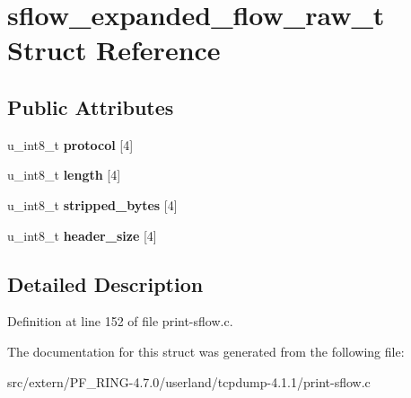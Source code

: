 \hypertarget{structsflow__expanded__flow__raw__t}{
\section{sflow\_\-expanded\_\-flow\_\-raw\_\-t Struct Reference}
\label{structsflow__expanded__flow__raw__t}
}
\subsection*{Public Attributes}
\begin{DoxyCompactItemize}
\item 
\hypertarget{structsflow__expanded__flow__raw__t_ad65c7dad7be3ce61db3a4368d838fb47}{
u\_\-int8\_\-t {\bfseries protocol} \mbox{[}4\mbox{]}}
\label{structsflow__expanded__flow__raw__t_ad65c7dad7be3ce61db3a4368d838fb47}

\item 
\hypertarget{structsflow__expanded__flow__raw__t_ab5ebb6ba470fd6ac9ab0b08929f1447d}{
u\_\-int8\_\-t {\bfseries length} \mbox{[}4\mbox{]}}
\label{structsflow__expanded__flow__raw__t_ab5ebb6ba470fd6ac9ab0b08929f1447d}

\item 
\hypertarget{structsflow__expanded__flow__raw__t_a815585905a9533e3095d9a379d3f690d}{
u\_\-int8\_\-t {\bfseries stripped\_\-bytes} \mbox{[}4\mbox{]}}
\label{structsflow__expanded__flow__raw__t_a815585905a9533e3095d9a379d3f690d}

\item 
\hypertarget{structsflow__expanded__flow__raw__t_a0df8825fe567f0b8993bbd09a1ee5edd}{
u\_\-int8\_\-t {\bfseries header\_\-size} \mbox{[}4\mbox{]}}
\label{structsflow__expanded__flow__raw__t_a0df8825fe567f0b8993bbd09a1ee5edd}

\end{DoxyCompactItemize}


\subsection{Detailed Description}


Definition at line 152 of file print-\/sflow.c.



The documentation for this struct was generated from the following file:\begin{DoxyCompactItemize}
\item 
src/extern/PF\_\-RING-\/4.7.0/userland/tcpdump-\/4.1.1/print-\/sflow.c\end{DoxyCompactItemize}
